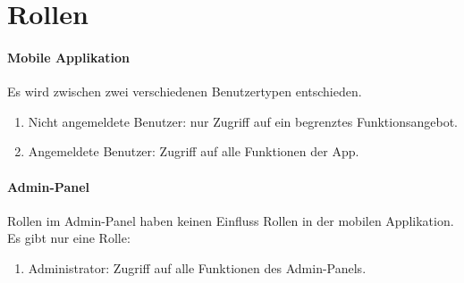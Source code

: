 \section{Rollen}

\paragraph{Mobile Applikation}
Es wird zwischen zwei verschiedenen Benutzertypen entschieden.
\begin{enumerate}
    \item Nicht angemeldete Benutzer: nur Zugriff auf ein begrenztes Funktionsangebot.
    \item Angemeldete Benutzer: Zugriff auf alle Funktionen der App.
\end{enumerate}

\paragraph{Admin-Panel}
Rollen im Admin-Panel haben keinen Einfluss Rollen in der mobilen Applikation.
Es gibt nur eine Rolle:
\begin{enumerate}
    \item Administrator: Zugriff auf alle Funktionen des Admin-Panels.
\end{enumerate}
